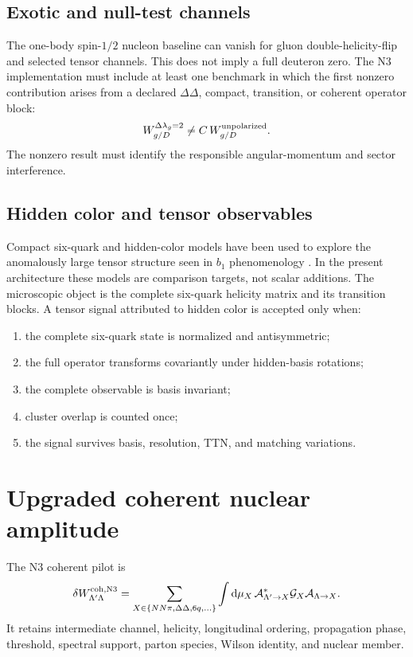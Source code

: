 \documentclass[11pt]{article}
\newcommand{\dd}{\mathrm{d}}
\begin{document}
\subsection{Exotic and null-test channels}

The one-body spin-\(1/2\) nucleon baseline can vanish for gluon double-helicity-flip and selected tensor channels.  This does not imply a full deuteron zero.  The N3 implementation must include at least one benchmark in which the first nonzero contribution arises from a declared \(\Delta\Delta\), compact, transition, or coherent operator block:
\begin{equation}
 W_{g/D}^{\Delta\lambda_g=2}
 \neq C\,W_{g/D}^{\rm unpolarized}.
\label{eq:n3-gluon-flip}
\end{equation}
The nonzero result must identify the responsible angular-momentum and sector interference.

\subsection{Hidden color and tensor observables}

Compact six-quark and hidden-color models have been used to explore the anomalously large tensor structure seen in \(b_1\) phenomenology \cite{Miller2014,MillerHiddenColor2014}.  In the present architecture these models are comparison targets, not scalar additions.  The microscopic object is the complete six-quark helicity matrix and its transition blocks.  A tensor signal attributed to hidden color is accepted only when:
\begin{enumerate}
\item the complete six-quark state is normalized and antisymmetric;
\item the full operator transforms covariantly under hidden-basis rotations;
\item the complete observable is basis invariant;
\item cluster overlap is counted once;
\item the signal survives basis, resolution, TTN, and matching variations.
\end{enumerate}

\section{Upgraded coherent nuclear amplitude}
\label{sec:coherent}

The N3 coherent pilot is
\begin{equation}
 \delta W_{\Lambda'\Lambda}^{\rm coh,N3}
 =\sum_{X\in\{NN\pi,\Delta\Delta,6q,\ldots\}}
 \int\dd\mu_X\,
 \mathcal A_{\Lambda'\to X}^{*}
 \mathcal G_X
 \mathcal A_{\Lambda\to X}.
\label{eq:n3-coherent}
\end{equation}
It retains intermediate channel, helicity, longitudinal ordering, propagation phase, threshold, spectral support, parton species, Wilson identity, and nuclear member.
\end{document}
